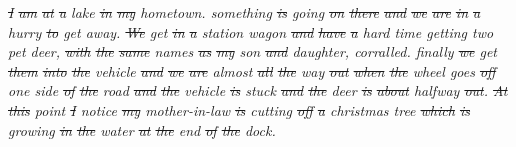 \begin{minipage}[t]{0.75\textwidth}
    \begin{spacing}{0.5}
    {\scriptsize \it
    \sout{I} \sout{am} \sout{at} \sout{a} {\color{orangeUnicam}lake} \sout{in} \sout{my} {\color{orangeUnicam}\color{orangeUnicam} hometown}.
    {\color{orangeUnicam}something} \sout{is} {\color{orangeUnicam}going} \sout{on} \sout{there} \sout{and} \sout{we} \sout{are} \sout{in}
    \sout{a} {\color{orangeUnicam}hurry} \sout{to} {\color{orangeUnicam}get} {\color{orangeUnicam}away}.
    \sout{We} {\color{orangeUnicam}get} \sout{in} \sout{a} {\color{orangeUnicam}station} {\color{orangeUnicam}wagon} \sout{and} \sout{have} \sout{a}
    {\color{orangeUnicam}hard} {\color{orangeUnicam}time} {\color{orangeUnicam}getting} {\color{orangeUnicam}two} {\color{orangeUnicam}pet} {\color{orangeUnicam}deer}, \sout{with} \sout{the}
    \sout{same} {\color{orangeUnicam}names} \sout{as} \sout{my} {\color{orangeUnicam}son} \sout{and} {\color{orangeUnicam}daughter}, {\color{orangeUnicam}corralled}.
    {\color{orangeUnicam}finally} \sout{we} {\color{orangeUnicam}get} \sout{them} \sout{into} \sout{the} {\color{orangeUnicam}vehicle} \sout{and} \sout{we}
    \sout{are} {\color{orangeUnicam}almost} \sout{all} \sout{the} {\color{orangeUnicam}way} \sout{out} \sout{when} \sout{the} {\color{orangeUnicam}wheel}
    {\color{orangeUnicam}goes} \sout{off} {\color{orangeUnicam}one} {\color{orangeUnicam}side} \sout{of} \sout{the} {\color{orangeUnicam}road}
    \sout{and} \sout{the} {\color{orangeUnicam}vehicle} \sout{is} {\color{orangeUnicam}stuck} \sout{and} \sout{the} {\color{orangeUnicam}deer} \sout{is}
    \sout{about} {\color{orangeUnicam}halfway} \sout{out}.
    \sout{At} \sout{this} {\color{orangeUnicam}point} \sout{I} {\color{orangeUnicam}notice} \sout{my} {\color{orangeUnicam}mother-in-law} \sout{is}
    {\color{orangeUnicam}cutting} \sout{off} \sout{a} {\color{orangeUnicam}christmas} {\color{orangeUnicam}tree} \sout{which} \sout{is} {\color{orangeUnicam}growing}
    \sout{in} \sout{the} {\color{orangeUnicam}water} \sout{at} \sout{the} {\color{orangeUnicam}end} \sout{of} \sout{the} {\color{orangeUnicam}dock}.}
    \end{spacing}
\end{minipage}